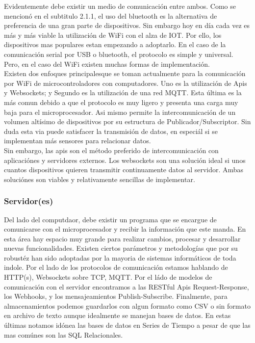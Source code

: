 Evidentemente debe existir un medio de comunicación entre ambos. Como se mencionó en el subtitulo 2.1.1, el uso del bluetooth es la alternativa de preferencia de una gran parte de dispositivos. Sin embargo hoy en día cada vez es más y más viable la utilización de WiFi con el alza de IOT. Por ello, los dispositivos mas populares estan empezando a adoptarlo. En el caso de la comunicación serial por USB o bluetooth, el protocolo es simple y universal. Pero, en el caso del WiFi existen muchas formas de implementación.\\

Existen dos enfoques principalesque se toman actualmente para la comunicación por WiFi de microcontroladores con computadores. Uno es la utilización de Apis y Websockets; y Segundo es la utilización de una red MQTT. Esta última es la más comun debido a que el protocolo es muy ligero y presenta una carga muy baja para el microprocesador. Asi mismo permite la intercomunicación de un volumen altísimo de dispositivos por su estructura de Publicador/Subscriptor. Sin duda esta via puede satisfacer la transmisión de datos, en especiál si se implementan más sensores para relacionar datos.\\

Sin embargo, las apis son el método preferido de intercomunicación con aplicaciónes y servidores externos. Los websockets son una solución ideal si unos cuantos dispositivos quieren transmitir continuamente datos al servidor. Ambas soluciónes son viables y relativamente sencillas de implementar.\\

\subsubsection{Servidor(es)}
\label{sec:orgd48ea32}
Del lado del computdaor, debe existir un programa que se encargue de comunicarse con el microprocesador y recibir la información que este manda. En esta área hay espacio muy grande para realizar cambios, procesar y desarrollar nuevas funcionalidades. Existen ciertos parámetros y metodologías que por su robustéz han sido adoptadas por la mayoria de sistemas informáticos de toda indole. Por el lado de los protocolos de comunicación estamos hablando de HTTP(s), Websockets sobre TCP, MQTT. Por el ládo de modelos de comunicación con el servidor encontramos a las RESTful Apis Request-Response, los Webhooks, y los mensajeamientos Publish-Subscribe. Finalmente, para almacenamientos podemos guardarlos con algun formato como CSV o sin formato en archivo de texto aunque idealmente se manejan bases de datos. En estas últimas notamos idónea las bases de datos en Series de Tiempo a pesar de que las mas comúnes son las SQL Relacionales.\\

